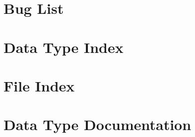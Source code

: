 \documentclass[twoside]{book}
\newcommand{\+}{\discretionary{\mbox{\scriptsize$\hookleftarrow$}}{}{}}
\begin{document}
\chapter{Bug List}
\label{bug}
\hypertarget{bug}{}

\chapter{Data Type Index}

\chapter{File Index}

\chapter{Data Type Documentation}











































\end{document}
